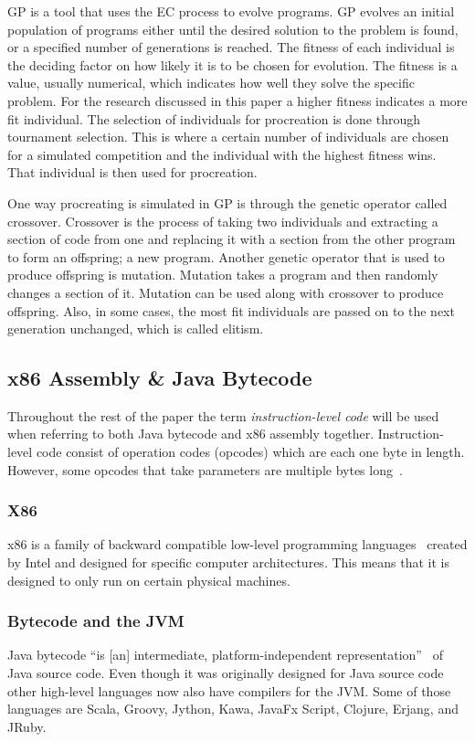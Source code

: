 \documentclass{sig-alternate}
\begin{document}
	GP is a tool that uses the EC process to evolve programs. GP evolves an initial population of programs either until the desired solution to the problem is found, or a specified number of generations is reached. The fitness of each individual is the deciding factor on how likely it is to be chosen for evolution. The fitness is a value, usually numerical, which indicates how well they solve the specific problem. For the research discussed in this paper a higher fitness indicates a more fit individual. The selection of individuals for procreation is done through tournament selection. This is where a certain number of individuals are chosen for a simulated competition and the individual with the highest fitness wins. That individual is then used for procreation.\par 	
	One way procreating is simulated in GP is through the genetic operator called crossover. Crossover is the process of taking two individuals and extracting a section of code from one and replacing it with a section from the other program to form an offspring; a new program. Another genetic operator that is used to produce offspring is mutation. Mutation takes a program and then randomly changes a section of it. Mutation can be used along with crossover to produce offspring. Also, in some cases, the most fit individuals are passed on to the next generation unchanged, which is called elitism.


\subsection{x86 Assembly \& Java Bytecode}
Throughout the rest of the paper the term \textit{instruction-level code} will be used when referring to both Java bytecode and x86 assembly together. Instruction-level code consist of operation codes (opcodes) which are each one byte in length. However, some opcodes that take parameters are multiple bytes long~\cite{JavaBytecode:2014,x86tomachine:2013}.

\subsubsection{X86}
x86 is a family of backward compatible low-level programming languages~\cite{x86assembly:2014} created by Intel and designed for specific computer architectures. This means that it is designed to only run on certain physical machines. 

\subsubsection{ Bytecode and the JVM}
Java bytecode ``is [an] intermediate, platform-independent representation''~\cite{FINCH2:2009} of Java source code. Even though it was originally designed for Java source code other high-level languages now also have compilers for the JVM. Some of those languages are Scala, Groovy, Jython, Kawa, JavaFx Script, Clojure, Erjang, and JRuby.
\end{document}
